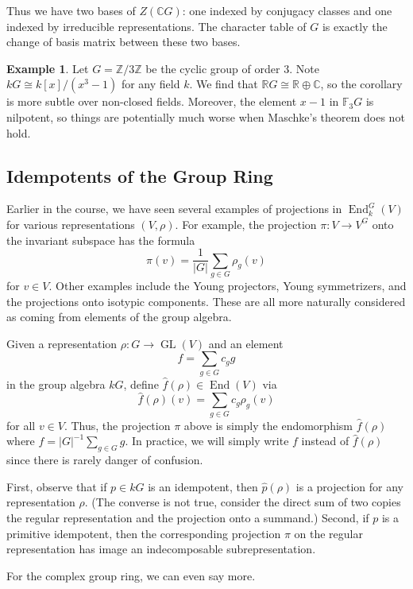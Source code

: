 \documentclass[12pt]{article}
\theoremstyle{plain}
\theoremstyle{definition}
\newtheorem{example}[theorem]{Example}
\theoremstyle{remark}
\numberwithin{equation}{section}
\begin{document}
Thus we have two bases of $Z(\mathbb{C}G)$: one indexed by conjugacy
classes and one indexed by irreducible representations.
The character table of $G$ is exactly the change of basis matrix between
these two bases.

\begin{example}
Let $G = \mathbb{Z}/3\mathbb{Z}$ be the cyclic group of order $3$.
Note $kG \cong k[x]/(x^3-1)$ for any field $k$.
We find that $\mathbb{R}G \cong \mathbb{R} \oplus \mathbb{C}$,
so the corollary is more subtle over non-closed fields.
Moreover, the element $x-1$ in $\mathbb{F}_3G$ is nilpotent,
so things are potentially much worse when Maschke's theorem does not
hold.
\end{example}

\subsection{Idempotents of the Group Ring}

Earlier in the course, we have seen several examples of projections in
$\operatorname{End}_k^G(V)$ for various representations $(V,\rho)$.
For example, the projection $\pi : V \to V^G$ onto the invariant
subspace has the formula
\[
\pi(v) = \frac{1}{|G|} \sum_{g \in G} \rho_g(v)
\]
for $v \in V$.
Other examples include the Young projectors, Young symmetrizers,
and the projections onto isotypic components.
These are all more naturally considered as coming from elements
of the group algebra.

Given a representation $\rho : G \to \operatorname{GL}(V)$
and an element
\[
f = \sum_{g \in G} c_g g
\]
in the group algebra $kG$,
define $\widehat{f}(\rho) \in \operatorname{End}(V)$ via
\[
\widehat{f}(\rho)(v) = \sum_{g \in G} c_g \rho_g(v)
\]
for all $v \in V$.
Thus, the projection $\pi$ above is simply the endomorphism
$\widehat{f}(\rho)$
where $f = |G|^{-1} \sum_{g \in G} g$.
In practice, we will simply write $f$ instead of $\widehat{f}(\rho)$
since there is rarely danger of confusion.

First, observe that if $p \in kG$ is an idempotent,
then $\widehat{p}(\rho)$ is a projection for any representation $\rho$.
(The converse is not true, consider the direct sum of two copies the regular
representation and the projection onto a summand.)
Second, if $p$ is a primitive idempotent, then the corresponding
projection $\pi$ on the regular representation has image an
indecomposable subrepresentation.

For the complex group ring, we can even say more.
\end{document}
